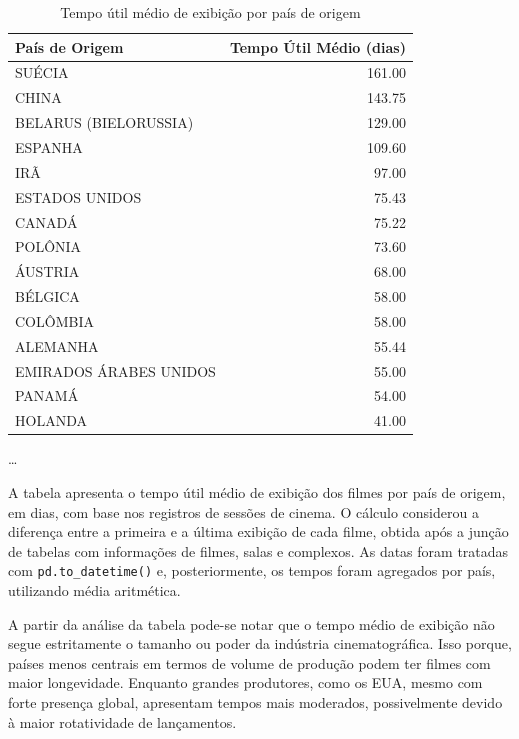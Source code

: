\documentclass{article}
\begin{document}
\begin{table}[H]
\centering
\caption{Tempo útil médio de exibição por país de origem\\}
\begin{small}
\begin{tabular}{l r}
\hline
\textbf{País de Origem} & \textbf{Tempo Útil Médio (dias)} \\
\hline
SUÉCIA & 161.00 \\
CHINA & 143.75 \\
BELARUS (BIELORUSSIA) & 129.00 \\
ESPANHA & 109.60 \\
IRÃ & 97.00 \\
ESTADOS UNIDOS & 75.43 \\
CANADÁ & 75.22 \\
POLÔNIA & 73.60 \\
ÁUSTRIA & 68.00 \\
BÉLGICA & 58.00 \\
COLÔMBIA & 58.00 \\
ALEMANHA & 55.44 \\
EMIRADOS ÁRABES UNIDOS & 55.00 \\
PANAMÁ & 54.00 \\
HOLANDA & 41.00 \\
\end{tabular}
\end{small}

\begin{center}
\small
\ldots
\end{center}

\end{table}
A tabela apresenta o tempo útil médio de exibição dos filmes por país de origem, em dias, com base nos registros de sessões de cinema. O cálculo considerou a diferença entre a primeira e a última exibição de cada filme, obtida após a junção de tabelas com informações de filmes, salas e complexos. As datas foram tratadas com \texttt{pd.to\_datetime()} e, posteriormente, os tempos foram agregados por país, utilizando média aritmética.


 
A partir da análise da tabela pode-se notar que o tempo médio de exibição não segue estritamente o tamanho ou poder da indústria cinematográfica.
Isso porque, países menos centrais em termos de volume de produção podem ter filmes com maior longevidade. Enquanto grandes produtores,
como os EUA, mesmo com forte presença global, apresentam tempos mais moderados, possivelmente devido à maior rotatividade de lançamentos.
\end{document}
